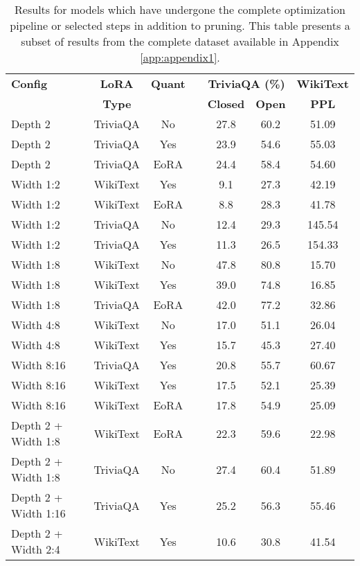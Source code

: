 {\footnotesize
\begin{table}[htbp]
\centering
\footnotesize
\caption[Results for Complete Pipeline Configurations (Subset)]{Results for models which have undergone the complete optimization pipeline or selected steps in addition to pruning. This table presents a subset of results from the complete dataset available in Appendix \ref{app:appendix1}.} \label{tab:complete_pipeline_results}
\begin{tabular}{lcclccc}
\hline
\textbf{Config} & \textbf{LoRA} & \textbf{Quant} & & \multicolumn{2}{c}{\textbf{TriviaQA (\%)}} & \textbf{WikiText} \\
\cline{5-6}
& \textbf{Type} & & & \textbf{Closed} & \textbf{Open} & \textbf{PPL} \\
\hline
Depth 2 & TriviaQA & No & & 27.8 & 60.2 & 51.09  \\
Depth 2 & TriviaQA & Yes & & 23.9 & 54.6 & 55.03  \\
Depth 2 & TriviaQA & EoRA & & 24.4 & 58.4 & 54.60  \\
Width 1:2 & WikiText & Yes & & 9.1 & 27.3 & 42.19  \\
Width 1:2 & WikiText & EoRA & & 8.8 & 28.3 & 41.78  \\
Width 1:2 & TriviaQA & No & & 12.4 & 29.3 & 145.54  \\
Width 1:2 & TriviaQA & Yes & & 11.3 & 26.5 & 154.33  \\
Width 1:8 & WikiText & No & & 47.8 & 80.8 & 15.70  \\
Width 1:8 & WikiText & Yes & & 39.0 & 74.8 & 16.85  \\
Width 1:8 & TriviaQA & EoRA & & 42.0 & 77.2 & 32.86  \\
Width 4:8 & WikiText & No & & 17.0 & 51.1 & 26.04  \\
Width 4:8 & WikiText & Yes & & 15.7 & 45.3 & 27.40  \\
Width 8:16 & TriviaQA & Yes & & 20.8 & 55.7 & 60.67  \\
Width 8:16 & WikiText & Yes & & 17.5 & 52.1 & 25.39  \\
Width 8:16 & WikiText & EoRA & & 17.8 & 54.9 & 25.09  \\
Depth 2 + Width 1:8 & WikiText & EoRA & & 22.3 & 59.6 & 22.98  \\
Depth 2 + Width 1:8 & TriviaQA & No & & 27.4 & 60.4 & 51.89  \\
Depth 2 + Width 1:16 & TriviaQA & Yes & & 25.2 & 56.3 & 55.46  \\
Depth 2 + Width 2:4 & WikiText & Yes & & 10.6 & 30.8 & 41.54  \\

\end{tabular}
\end{table}}
